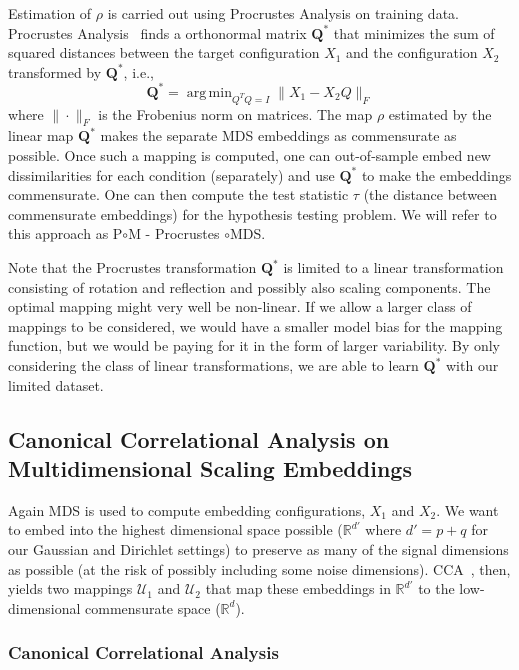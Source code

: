 \documentclass[11pt]{article} %
\DeclareMathOperator*{\argmin}{arg\,min}
\begin{document}
Estimation of $\rho$ is carried out using  Procrustes Analysis  on training data. Procrustes Analysis~\cite{Sibson} finds a orthonormal matrix $\mathbf{Q}^*$ that minimizes the sum of squared distances between the  target configuration $X_1$ and  the configuration $X_2$ transformed by $\mathbf{Q}^*$, i.e.,
 \[\mathbf{Q}^* = \argmin_{Q^TQ = I} \|X_1 - X_2Q\|_F\] 
 where $\|\cdot\|_F$ is the Frobenius norm on matrices. The map $\rho$ estimated by the linear map $\mathbf{Q}^*$   makes the separate MDS embeddings as commensurate as possible. Once such a mapping is computed, one can out-of-sample embed  new dissimilarities for each condition (separately)  and  use $\mathbf{Q}^*$ to make the embeddings commensurate.
One can then compute the test statistic $\tau$ (the distance between commensurate embeddings) for  the hypothesis testing problem. We will refer to this approach as P$\circ$M - Procrustes $\circ$MDS.

Note that the Procrustes transformation $\mathbf{Q}^*$  is limited to  a linear transformation consisting of rotation and reflection and possibly also scaling components. The optimal mapping might  very well be   non-linear. If we allow  a larger class of mappings to be considered, we would have a smaller model bias for the mapping function, but we would be paying for it  in the form of larger variability. By only considering the class of linear transformations, we are able  to learn $\mathbf{Q}^{*}$ with our limited dataset.


\subsection{Canonical Correlational  Analysis on Multidimensional Scaling Embeddings} 

Again MDS is used  to compute embedding configurations, $ X_1$ and $X_2$. We want to embed into the highest dimensional space  possible ($\mathbb{R}^{d'}$ where $d'=p+q$ for our Gaussian and Dirichlet settings)  to  preserve as many of the signal dimensions as possible (at the risk of possibly including  some noise dimensions). CCA~\cite{Hardoon2004}, then,  yields two mappings $\mathcal{U}_1$ and $\mathcal{U}_2$ that map these embeddings in $\mathbb{R}^{d'}$ to  the low-dimensional commensurate space ($\mathbb{R}^d$). 

\subsubsection*{Canonical Correlational Analysis}
\end{document}
